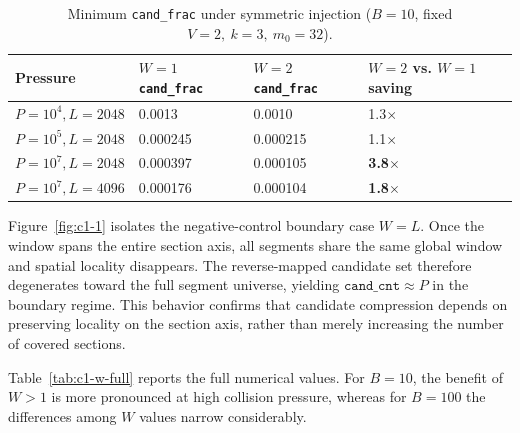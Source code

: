 \begin{table}[!thbp]
\centering
\small
\begin{tabular}{llll}
\toprule
Pressure & \shortstack{$W=1$\\\texttt{cand\_frac}} & \shortstack{$W=2$\\\texttt{cand\_frac}} & \shortstack{$W=2$ vs.\\ $W=1$ saving} \\
\midrule
$P=10^4, L=2048$ & 0.0013 & 0.0010 & 1.3$\times$ \\
$P=10^5, L=2048$ & 0.000245 & 0.000215 & 1.1$\times$ \\
$P=10^7, L=2048$ & 0.000397 & 0.000105 & \textbf{3.8$\times$} \\
$P=10^7, L=4096$ & 0.000176 & 0.000104 & \textbf{1.8$\times$} \\
\bottomrule
\end{tabular}
\caption{Minimum \texttt{cand\_frac} under symmetric injection ($B=10$, fixed $V{=}2,\ k{=}3,\ m_0{=}32$).}
\label{tab:c1-2}
\end{table}

Figure~\ref{fig:c1-1} isolates the negative-control boundary case $W{=}L$. Once the window spans the entire section axis, all segments share the same global window and spatial locality disappears. The reverse-mapped candidate set therefore degenerates toward the full segment universe, yielding $\texttt{cand\_cnt}\approx P$ in the boundary regime. This behavior confirms that candidate compression depends on preserving locality on the section axis, rather than merely increasing the number of covered sections.





Table~\ref{tab:c1-w-full} reports the full numerical values. For $B=10$, the benefit of $W>1$ is more pronounced at high collision pressure, whereas for $B=100$ the differences among $W$ values narrow considerably.

